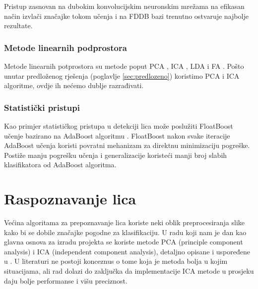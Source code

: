 \documentclass[times, utf8, seminar, numeric]{fer}
\begin{document}
Pristup zasnovan na dubokim konvolucijskim neuronskim mrežama \cite{zhang2014improving} na efikasan način izvlači značajke tokom učenja i na FDDB bazi trenutno ostvaruje najbolje rezultate. 

\subsubsection{Metode linearnih podprostora}

Metode linearnih potprostora su metode poput PCA , ICA , LDA  i FA . Pošto unutar predloženog rješenja (poglavlje \ref{sec:predlozeno}) koristimo PCA i ICA algoritme, ovdje ih nećemo dublje razrađivati.

\subsubsection{Statistički pristupi}

Kao primjer statističkog pristupa u detekciji lica može poslužiti FloatBoost učenje bazirano na AdaBoost algoritmu \cite{Li04floatboostlearning}. FloatBoost nakon svake iteracije AdaBoost učenja koristi povratni mehanizam za direktnu minimizaciju pogreške. Postiže manju pogrešku učenja i generalizacije koristeći manji broj slabih klasifikatora od AdaBoost algoritma.

\section{Raspoznavanje lica}

Većina algoritama za prepoznavanje lica koriste neki oblik preprocesiranja slike kako bi se dobile značajke pogodne za klasifikaciju. U radu koji nam je dan kao glavna osnova za izradu projekta se koriste metode PCA (principle component analysis) i ICA (independent component analysis), detaljno opisane i uspoređene u \cite{Draper:2003:RFP:950135.950141}. U literaturi ne postoji konceznus o tome koja je metoda bolja u kojim situacijama, ali rad dolazi do zaključka da implementacije ICA metode u prosjeku daju bolje performanse i višu preciznost.
\end{document}
